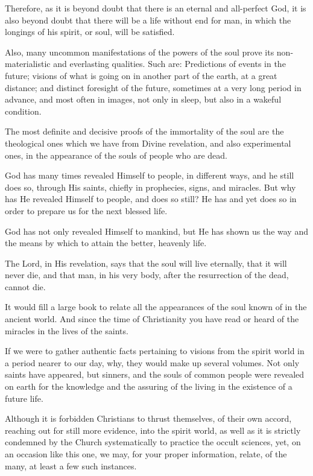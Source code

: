 Therefore, as it is beyond doubt that there is an eternal and all-perfect God, it is also beyond doubt that there will be a life without end for man, in which the longings of his spirit, or soul, will be satisfied.

Also, many uncommon manifestations of the powers of the soul prove its non-materialistic and everlasting qualities. Such are: Predictions of events in the future; visions of what is going on in another part of the earth, at a great distance; and distinct foresight of the future, sometimes at a very long period in advance, and most often in images, not only in sleep, but also in a wakeful condition.

The most definite and decisive proofs of the immortality of the soul are the theological ones which we have from Divine revelation, and also experimental ones, in the appearance of the souls of people who are dead.

God has many times revealed Himself to people, in different ways, and he still does so, through His saints, chiefly in prophecies, signs, and miracles. But why has He revealed Himself to people, and does so still? He has and yet does so in order to prepare us for the next blessed life.

God has not only revealed Himself to mankind, but He has shown us the way and the means by which to attain the better, heavenly life.

The Lord, in His revelation, says that the soul will live eternally, that it will never die, and that man, in his very body, after the resurrection of the dead, cannot die.

It would fill a large book to relate all the appearances of the soul known of in the ancient world. And since the time of Christianity you have read or heard of the miracles in the lives of the saints.

If we were to gather authentic facts pertaining to visions from the spirit world in a period nearer to our day, why, they would make up several volumes. Not only saints have appeared, but sinners, and the souls of common people were revealed on earth for the knowledge and the assuring of the living in the existence of a future life.

Although it is forbidden Christians to thrust themselves, of their own accord, reaching out for still more evidence, into the spirit world, as well as it is strictly condemned by the Church systematically to practice the occult sciences, yet, on an occasion like this one, we may, for your proper information, relate, of the many, at least a few such instances.

